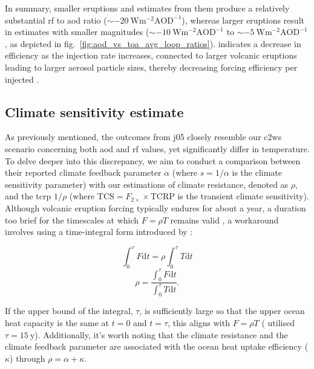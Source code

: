 \documentclass{ametsocV6.1}
\newcommand{\iso}[1][i]{{#1}njected \ce{SO2}}
\begin{document}
In summary, smaller eruptions and estimates from them produce a relatively substantial
\gls{rf} to \gls{aod} ratio (\(\sim \SI{-20}{\watt\metre^{-2}\mathrm{AOD}^{-1}}\)),
whereas larger eruptions result in estimates with smaller magnitudes (\(\sim
\SI{-10}{\watt\metre^{-2}\mathrm{AOD}^{-1}}\) to \(\sim
\SI{-5}{\watt\metre^{-2}\mathrm{AOD}^{-1}}\), as depicted in
fig.~\ref{fig:aod_vs_toa_avg_loop_ratios}). \citet{niemeier2017} indicates a decrease in
efficiency as the injection rate increases, connected to larger volcanic eruptions
leading to larger aerosol particle sizes, thereby decreasing forcing efficiency per
\iso{} \citep{english2013, timmreck2018}.

\subsection{Climate sensitivity estimate}

As previously mentioned, the outcomes from \gls{j05} closely resemble our \gls{c2ws}
scenario concerning both \gls{aod} and \gls{rf} values, yet significantly differ in
temperature. To delve deeper into this discrepancy, we aim to conduct a comparison
between their reported climate feedback parameter \(\alpha \) (where \(s=1/\alpha \) is
the climate sensitivity parameter) with our estimations of climate resistance, denoted
as \(\rho \), and the \gls{tcrp} \(1/\rho\) (where \(\mathrm{TCS}=F_{2\times}\times
\mathrm{TCRP}\) is the transient climate sensitivity). Although volcanic eruption
forcing typically endures for about a year, a duration too brief for the timescales at
which \(F=\rho T\) remains valid \citep{gregory2016}, a workaround involves using a
time-integral form introduced by \citet{merlis2014}:

\begin{equation}
  \int_0^{\tau}F \mathrm{d}t=\rho\int_{0}^{\tau}T \mathrm{d}t
\end{equation}
\begin{equation}
  \rho=\frac{\int_0^{\tau}F \mathrm{d}t}{\int_{0}^{\tau}T \mathrm{d}t}.
  \label{eq:climate-resistance}
\end{equation}

If the upper bound of the integral, \(\tau \), is sufficiently large so that the upper
ocean heat capacity is the same at \(t=0\) and \(t=\tau \), this aligns with \(F=\rho
T\) \citep{gregory2016} (\citet{merlis2014} utilised \(\tau =\SI{15}{\mathrm{y}}\)).
Additionally, it's worth noting that the climate resistance and the climate feedback
parameter are associated with the ocean heat uptake efficiency (\(\kappa \)) through
\(\rho =\alpha +\kappa \).
\end{document}
